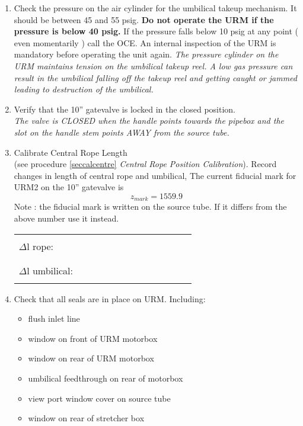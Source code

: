 \begin{enumerate}
\item\checkbox Check the pressure on the air cylinder for the umbilical
takeup mechanism. It should be between 45 and 55 psig. 
   {\bf Do not operate the URM if the pressure is below 40 psig. }
 If the pressure falls below 10 psig at any point ( even momentarily ) call the OCE. 
An internal inspection of the URM is mandatory before operating the unit again.
   \small
   {\em
     The pressure cylinder on the URM maintains tension on the umbilical
     takeup reel.  A low gas pressure can result in the umbilical falling
     off the takeup reel and getting caught or jammed leading to destruction
     of the umbilical.
   }
   \normalsize
  
   
\item\checkbox Verify that the 10'' gatevalve  is locked in the  closed position.\\
   \small
   {\em
     The valve is CLOSED when the handle points towards the pipebox and the slot
      on the handle stem points AWAY from the source tube.
   }
   \normalsize
 
\item \checkbox Calibrate Central Rope Length\\
      (see procedure  \ref{seccalcentre} 
       {\em Central Rope Position Calibration}).
      Record changes in length of central rope and umbilical,
      The current fiducial mark for URM2  on the 10'' gatevalve
      is
      \[
               z_{mark} = 1559.9
      \]
       Note : the fiducial mark is written on the source tube. If it
       differs from the above number use it instead. 

     \begin{center}
     \begin{tabular}{|l|}
     \hline
      \\
     $\Delta$l rope:~~~~~~~~~~~~~~~~~~~~~~~~\\
      \\
     \hline
      \\
     $\Delta$l umbilical:~~~~~~~~~~~~~~~~~~~~~~~~\\
      \\
     \hline
     \end{tabular}
     \end{center}


\item\checkbox Check that all seals are in place on URM.  Including:
   \begin{itemize}
      \item\checkbox flush inlet line
      \item\checkbox window on front of URM  motorbox
      \item\checkbox window on rear of URM motorbox
      \item\checkbox umbilical feedthrough on rear of motorbox
      \item\checkbox view port window cover on source tube
			\item\checkbox window on rear of stretcher box
   \end{itemize}


\end{enumerate}
